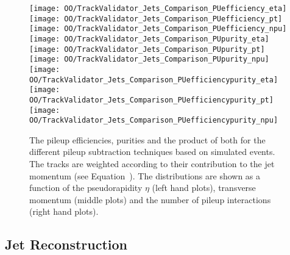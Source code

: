 \begin{figure}[h!t]
  \centering
  \texttt{[image: OO/TrackValidator\_Jets\_Comparison\_PUefficiency\_eta]}
  \texttt{[image: OO/TrackValidator\_Jets\_Comparison\_PUefficiency\_pt]}
  \texttt{[image: OO/TrackValidator\_Jets\_Comparison\_PUefficiency\_npu]}
  \\
  \texttt{[image: OO/TrackValidator\_Jets\_Comparison\_PUpurity\_eta]}
  \texttt{[image: OO/TrackValidator\_Jets\_Comparison\_PUpurity\_pt]}
  \texttt{[image: OO/TrackValidator\_Jets\_Comparison\_PUpurity\_npu]}
  \\
  \texttt{[image: OO/TrackValidator\_Jets\_Comparison\_PUefficiencypurity\_eta]}
  \texttt{[image: OO/TrackValidator\_Jets\_Comparison\_PUefficiencypurity\_pt]}
  \texttt{[image: OO/TrackValidator\_Jets\_Comparison\_PUefficiencypurity\_npu]}
  \caption[Pileup efficiencies, purities and their product for the different pileup subtraction techniques based on simulated \ttbar events with jet weight]{The pileup efficiencies, purities and the product of both for the different pileup subtraction techniques based on simulated \ttbar events. The tracks are weighted according to their contribution to the jet momentum (see Equation~). The distributions are shown as a function of the pseudorapidity $\eta$ (left hand plots), transverse momentum (middle plots) and the number of pileup interactions (right hand plots). \label{plot:OOJetsTVCompTTPileup}}
\end{figure}



\subsection{Jet Reconstruction \label{sec:OOJetsPtResponse}}

